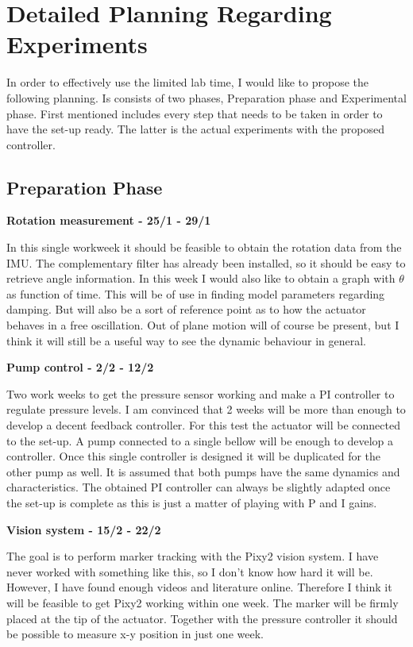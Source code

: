 \section{Detailed Planning Regarding Experiments}


In order to effectively use the limited lab time, I would like to propose the following planning. Is consists of two phases, Preparation phase and Experimental phase. First mentioned includes every step that needs to be taken in order to have the set-up ready. The latter is the actual experiments with the proposed controller.


\subsection{Preparation Phase}


\textbf{Rotation measurement - 25/1 - 29/1}

In this single workweek it should be feasible to obtain the rotation data from the IMU. The complementary filter has already been installed, so it should be easy to retrieve angle information. In this week I would also like to obtain a graph with $\theta$ as function of time. This will be of use in finding model parameters regarding damping. But will also be a sort of reference point as to how the actuator behaves in a free oscillation. Out of plane motion will of course be present, but I think it will still be a useful way to see the dynamic behaviour in general.


\textbf{Pump control - 2/2 - 12/2}

Two work weeks to get the pressure sensor working and make a PI controller to regulate pressure levels. I am convinced that 2 weeks will be more than enough to develop a decent feedback controller. For this test the actuator will be connected to the set-up. A pump connected to a single bellow will be enough to develop a controller. Once this single controller is designed it will be duplicated for the other pump as well. It is assumed that both pumps have the same dynamics and characteristics. The obtained PI controller can always be slightly adapted once the set-up is complete as this is just a matter of playing with P and I gains.


\textbf{Vision system - 15/2 - 22/2}

The goal is to perform marker tracking with the Pixy2 vision system. I have never worked with something like this, so I don't know how hard it will be. However, I have found enough videos and literature online. Therefore I think it will be feasible to get Pixy2 working within one week. The marker will be firmly placed at the tip of the actuator. Together with the pressure controller it should be possible to measure x-y position in just one week.

